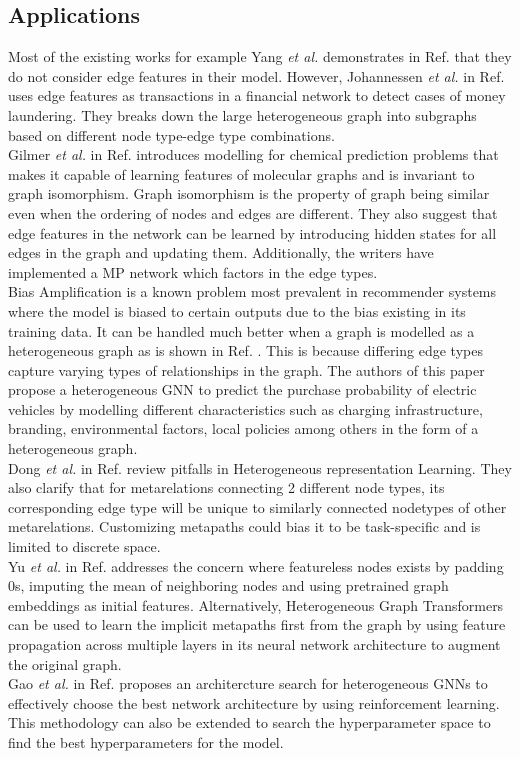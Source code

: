\documentclass{report} %
\begin{document}
\subsection{Applications}\label{subsec:HGNN Applications}
Most of the existing works for example Yang \textit{et al.} demonstrates in Ref. \cite{HGNN-2020} that they do not consider edge features in their model. 
However, Johannessen \textit{et al.} in Ref. \cite{ML HGNN-2023} uses edge features as transactions in a financial network to detect cases of money laundering.
They breaks down the large heterogeneous graph into subgraphs based on different node type-edge type combinations. \\
Gilmer \textit{et al.} in Ref. \cite{QC-MP-2017} introduces modelling for chemical prediction problems that makes it capable of learning features of molecular graphs 
and is invariant to graph isomorphism. Graph isomorphism is the property of graph being similar even when the ordering of nodes and edges are different.
They also suggest that edge features in the network can be learned by introducing hidden states for all edges in the graph and updating them.
Additionally, the writers have implemented a \ac{MP} network which factors in the edge types.\\
Bias Amplification is a known problem most prevalent in recommender systems where the model is biased to certain outputs due to the bias existing in its training data.
It can be handled much better when a graph is modelled as a heterogeneous graph as is shown in Ref. \cite{EV HGNN-2023}. This is because differing 
edge types capture varying types of relationships in the graph. The authors of this paper propose a heterogeneous \ac{GNN} to predict the purchase probability of 
electric vehicles by modelling different characteristics such as charging infrastructure, branding, environmental factors, local policies among others in the form of a 
heterogeneous graph.\\
Dong \textit{et al.} in Ref. \cite{HNRL-2020} review pitfalls in Heterogeneous representation Learning. They also clarify that for metarelations connecting 2 different 
node types, its corresponding edge type will be unique to similarly connected nodetypes of other metarelations. Customizing metapaths could bias it to be task-specific 
and is limited to discrete space.\\
Yu \textit{et al.} in Ref. \cite{SHGNN-2020} addresses the concern where featureless nodes exists by padding 0s, imputing the mean of neighboring nodes and using pretrained graph 
embeddings as initial features. 
Alternatively, Heterogeneous Graph Transformers can be used to learn the implicit metapaths first from the graph by using feature propagation across multiple layers in its 
neural network architecture to augment the original graph.\\
Gao \textit{et al.} in Ref. \cite{HGNNAS-2021} proposes an architercture search for heterogeneous \ac{GNN}s to effectively choose the best network architecture by using 
reinforcement learning. This methodology can also be extended to search the hyperparameter space to find the best hyperparameters for the model.\\
\end{document}
